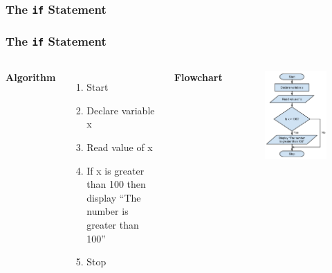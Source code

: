 \documentclass{beamer}
\begin{document}
\begin{frame}[fragile]
    \frametitle{The \texttt{if} Statement}
    \subsubsection{The \texttt{if} Statement} %
    \label{ssub:the_if}
    \begin{columns}
    \textbf{Algorithm}
    \begin{enumerate}
        \item Start
        \item Declare variable x
        \item Read value of x
        \item If x is greater than 100 then display ``The number is greater than 100''
        \item Stop
    \end{enumerate}
    \textbf{Flowchart}
    \begin{figure}
        \centering
        \includegraphics[scale=0.47]{flowchart}
    \end{figure}
    \end{columns}
\end{frame}
\end{document}
